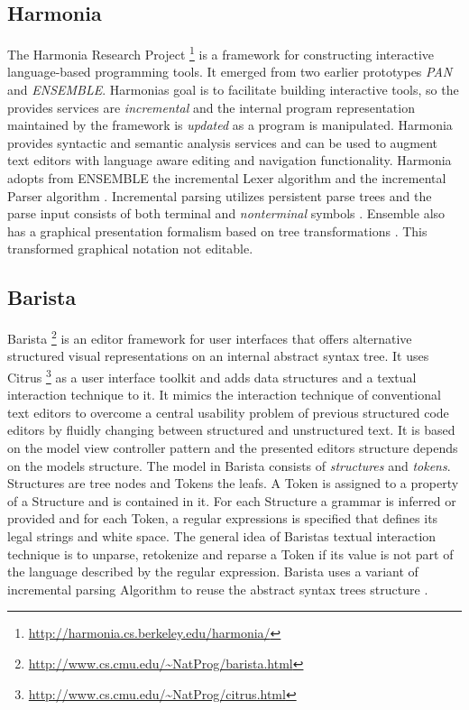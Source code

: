 \subsection{Harmonia}
The Harmonia Research Project \footnote{\raggedright \url{http://harmonia.cs.berkeley.edu/harmonia/}} is a framework for constructing interactive
language-based programming tools. It emerged from two earlier prototypes \emph{PAN} and \emph{ENSEMBLE}. Harmonias goal is to facilitate building interactive tools, so the provides services are \emph{incremental} and the internal program representation maintained by the framework is \emph{updated} as a program is manipulated. Harmonia provides syntactic and semantic analysis services \cite{harmonia} and can be used to augment text editors with language aware editing and navigation functionality. Harmonia adopts from ENSEMBLE the incremental Lexer algorithm \cite{ilex} and the incremental Parser algorithm \cite{iglrPaper}. Incremental parsing utilizes persistent parse trees and the parse input consists of both terminal and \emph{nonterminal} symbols \cite{iglrPaper}. Ensemble also has a graphical presentation formalism based on tree transformations \cite{ensemble}. This transformed graphical notation not editable.

\subsection{Barista}
Barista \footnote{\raggedright \url{http://www.cs.cmu.edu/~NatProg/barista.html}} is an editor framework for user interfaces that offers alternative structured visual representations on an internal abstract syntax tree. It uses Citrus \footnote{\raggedright \url{http://www.cs.cmu.edu/~NatProg/citrus.html}} as a user interface toolkit \cite{citrus} and adds data structures and a textual interaction technique to it. It mimics the interaction technique of conventional text editors to overcome a central usability problem of previous structured code editors by fluidly changing between structured and unstructured text. It is based on the model view controller pattern \cite{patterns} and the presented editors structure depends on the models structure. The model in Barista consists of \emph{structures} and \emph{tokens}. Structures are tree nodes and Tokens the leafs. A Token is assigned to a property of a Structure and is contained in it. For each Structure a grammar is inferred or provided and for each Token, a regular expressions is specified that defines its legal strings and white space. The general idea of Baristas textual interaction technique is to unparse, retokenize and reparse a Token if its value is not part of the language described by the regular expression. Barista uses a variant of \cite{iglrPaper} incremental parsing Algorithm to reuse the abstract syntax trees structure \cite{Barista}. 